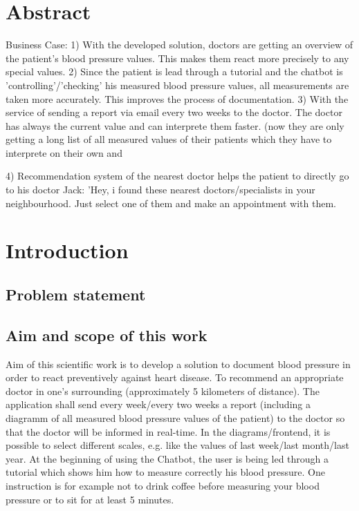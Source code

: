 



\chapter{Abstract}\label{abstract}

Business Case:
1) With the developed solution, doctors are getting an overview of the patient's blood pressure values. This makes them react more precisely to any special values. 
2) Since the patient is lead through a tutorial and the chatbot is 'controlling'/'checking' his measured blood pressure values, all measurements are taken more accurately. This improves the process of documentation.
3) With the service of sending a report via email every two weeks to the doctor. The doctor has always the current value and can interprete them faster. (now they are only getting a long list of all measured values of their patients which they have to interprete on their own and \begin{flushleft}
\end{flushleft}
4) Recommendation system of the nearest doctor helps the patient to directly go to his doctor 
Jack: 'Hey, i found these nearest doctors/specialists in your neighbourhood. Just select one of them and make an appointment with them. 

\chapter{Introduction}\label{introduction}

\section{Problem statement}

\section{Aim and scope of this work}
Aim of this scientific work is to develop a solution to document blood pressure in order to react preventively against heart disease.
To recommend an appropriate doctor in one's surrounding (approximately 5 kilometers of distance).
The application shall send every week/every two weeks a report (including a diagramm of all measured blood pressure values of the patient) to the doctor so that the doctor will be informed in real-time. In the diagrams/frontend, it is possible to select different scales, e.g. like the values of last week/last month/last year. 
At the beginning of using the Chatbot, the user is being led through a tutorial which shows him how to measure correctly his blood pressure. One instruction is for example not to drink coffee before measuring your blood pressure or to sit for at least 5 minutes.


